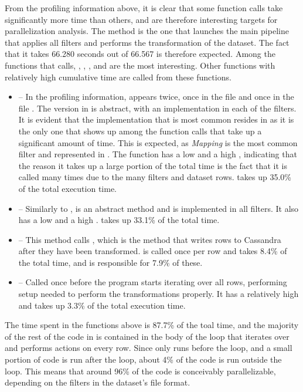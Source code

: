 From the profiling information above, it is clear that some function calls take significantly more time than others, and are therefore
interesting targets for parallelization analysis. The  method is the one that launches the main pipeline that applies all
filters and performs the transformation of the dataset. The fact that it takes 66.280 seconds out of 66.567 is therefore expected. Among
the functions that  calls, , , , and  are the most
interesting. Other functions with relatively high cumulative time are called from these functions.
\begin{itemize}
  \item {} -- In the profiling information,  appears twice, once in the file  and once in the file
    . The version in  is abstract, with an implementation in each of the filters. It is evident that the implementation
    that is most common resides in  as it is the only one that shows up among the function calls that take up a significant amount of time.
    This is expected, as \textit{Mapping} is the most common filter and represented in . The function has a low  and a high
    , indicating that the reason it takes up a large portion of the total time is the fact that it is called many times due to the many filters
    and dataset rows.  takes up 35.0\% of the total execution time.
  \item {} -- Similarly to ,  is an abstract method and is implemented in all filters.
    It also has a low  and a high .  takes up 33.1\% of the total time.
  \item {} -- This method calls , which is the method that writes rows to Cassandra after they have been transformed.
     is called once per row and takes 8.4\% of the total time, and  is responsible for 7.9\% of these. 
  \item {} -- Called once before the program starts iterating over all rows, performing setup needed to perform the transformations properly.
    It has a relatively high  and takes up 3.3\% of the total execution time.
\end{itemize}
The time spent in the functions above is 87.7\% of the toal time, and the majority of the rest of the code in  is contained in the body of the loop that iterates
over and performs actions on every row. Since only  runs before the loop, and a small portion of code is run after the loop, about 4\% of the code 
is run outside the loop. This means that around 96\% of the code is conceivably parallelizable, depending on the filters in the dataset's file format.\\

